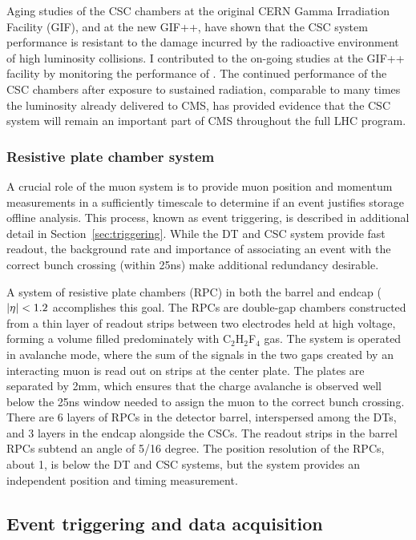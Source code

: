 Aging studies of the CSC chambers at the original CERN Gamma
Irradiation Facility (GIF), and at the new GIF++, have shown that the CSC system
performance is resistant to the damage incurred by the radioactive environment
of high luminosity collisions. I contributed to the on-going studies at the 
GIF++ facility by monitoring the performance of . The continued performance
of the CSC chambers after exposure to sustained radiation, comparable
to many times the luminosity already delivered to CMS,
has provided evidence that the CSC system will remain an important part
of CMS throughout the full LHC program.

\subsubsection{Resistive plate chamber system}

A crucial role of the muon system is to provide muon position and momentum
measurements in a sufficiently timescale
to determine if an event justifies storage offline analysis. 
This process, known as event triggering,
is described in additional detail in Section~\ref{sec:triggering}.
While the DT and CSC system provide fast readout, the background rate and
importance of associating an event with the correct bunch crossing (within
25\unit{ns}) make additional redundancy desirable.

A system of resistive plate chambers (RPC) in both the barrel and endcap
($\lvert \eta \rvert < 1.2$ accomplishes this goal. The RPCs are double-gap chambers
constructed from a thin layer of readout strips between two electrodes held 
at high voltage, forming a volume filled predominately with C$_2$H$_2$F$_4$ gas.
The system is operated in avalanche mode, where the sum of the signals
in the two gaps created by an interacting muon is read out on strips
at the center plate. The plates are separated by 2\unit{mm}, which ensures
that the charge avalanche is observed well below the 25\unit{ns} window
needed to assign the muon to the correct bunch crossing.
There are 6 layers of RPCs in the detector barrel, interspersed among the DTs,
and 3 layers in the endcap alongside the CSCs. The readout strips in the barrel RPCs
subtend an angle of 5/16 degree. The position resolution of the RPCs, about 1\cm,
is below the DT and CSC systems, but the system provides an independent position
and timing measurement. 

\subsection{Event triggering and data acquisition}

